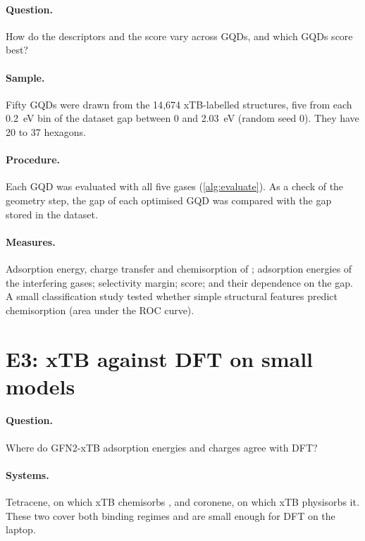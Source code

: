 \paragraph{Question.} How do the  descriptors and the score vary across GQDs, and which
GQDs score best?

\paragraph{Sample.} Fifty GQDs were drawn from the 14{,}674 xTB-labelled structures, five from
each 0.2~eV bin of the dataset gap between 0 and 2.03~eV (random seed 0). They have 20 to 37
hexagons.

\paragraph{Procedure.} Each GQD was evaluated with all five gases (\cref{alg:evaluate}). As a
check of the geometry step, the gap of each optimised GQD was compared with the gap stored in the
dataset.

\paragraph{Measures.} Adsorption energy, charge transfer and chemisorption of ; adsorption
energies of the interfering gases; selectivity margin; score; and their dependence on the gap. A
small classification study tested whether simple structural features predict chemisorption (area
under the ROC curve).

\section{E3: xTB against DFT on small models}
\label{sec:e3}

\paragraph{Question.} Where do GFN2-xTB adsorption energies and charges agree with DFT?

\paragraph{Systems.} Tetracene, on which xTB chemisorbs , and coronene, on which xTB
physisorbs it. These two cover both binding regimes and are small enough for DFT on the laptop.

